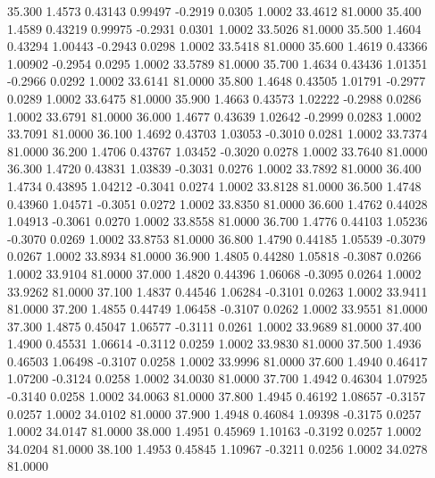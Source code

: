  35.300   1.4573   0.43143   0.99497  -0.2919   0.0305   1.0002  33.4612  81.0000
  35.400   1.4589   0.43219   0.99975  -0.2931   0.0301   1.0002  33.5026  81.0000
  35.500   1.4604   0.43294   1.00443  -0.2943   0.0298   1.0002  33.5418  81.0000
  35.600   1.4619   0.43366   1.00902  -0.2954   0.0295   1.0002  33.5789  81.0000
  35.700   1.4634   0.43436   1.01351  -0.2966   0.0292   1.0002  33.6141  81.0000
  35.800   1.4648   0.43505   1.01791  -0.2977   0.0289   1.0002  33.6475  81.0000
  35.900   1.4663   0.43573   1.02222  -0.2988   0.0286   1.0002  33.6791  81.0000
  36.000   1.4677   0.43639   1.02642  -0.2999   0.0283   1.0002  33.7091  81.0000
  36.100   1.4692   0.43703   1.03053  -0.3010   0.0281   1.0002  33.7374  81.0000
  36.200   1.4706   0.43767   1.03452  -0.3020   0.0278   1.0002  33.7640  81.0000
  36.300   1.4720   0.43831   1.03839  -0.3031   0.0276   1.0002  33.7892  81.0000
  36.400   1.4734   0.43895   1.04212  -0.3041   0.0274   1.0002  33.8128  81.0000
  36.500   1.4748   0.43960   1.04571  -0.3051   0.0272   1.0002  33.8350  81.0000
  36.600   1.4762   0.44028   1.04913  -0.3061   0.0270   1.0002  33.8558  81.0000
  36.700   1.4776   0.44103   1.05236  -0.3070   0.0269   1.0002  33.8753  81.0000
  36.800   1.4790   0.44185   1.05539  -0.3079   0.0267   1.0002  33.8934  81.0000
  36.900   1.4805   0.44280   1.05818  -0.3087   0.0266   1.0002  33.9104  81.0000
  37.000   1.4820   0.44396   1.06068  -0.3095   0.0264   1.0002  33.9262  81.0000
  37.100   1.4837   0.44546   1.06284  -0.3101   0.0263   1.0002  33.9411  81.0000
  37.200   1.4855   0.44749   1.06458  -0.3107   0.0262   1.0002  33.9551  81.0000
  37.300   1.4875   0.45047   1.06577  -0.3111   0.0261   1.0002  33.9689  81.0000
  37.400   1.4900   0.45531   1.06614  -0.3112   0.0259   1.0002  33.9830  81.0000
  37.500   1.4936   0.46503   1.06498  -0.3107   0.0258   1.0002  33.9996  81.0000
  37.600   1.4940   0.46417   1.07200  -0.3124   0.0258   1.0002  34.0030  81.0000
  37.700   1.4942   0.46304   1.07925  -0.3140   0.0258   1.0002  34.0063  81.0000
  37.800   1.4945   0.46192   1.08657  -0.3157   0.0257   1.0002  34.0102  81.0000
  37.900   1.4948   0.46084   1.09398  -0.3175   0.0257   1.0002  34.0147  81.0000
  38.000   1.4951   0.45969   1.10163  -0.3192   0.0257   1.0002  34.0204  81.0000
  38.100   1.4953   0.45845   1.10967  -0.3211   0.0256   1.0002  34.0278  81.0000
